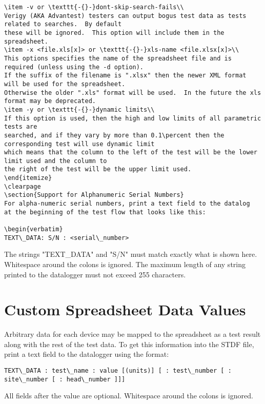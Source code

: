 \documentclass[letterpaper]{article}
\begin{document}
\begin{verbatim}
\item -v or \texttt{-{}-}dont-skip-search-fails\\
Verigy (AKA Advantest) testers can output bogus test data as tests related to searches.  By default
these will be ignored.  This option will include them in the spreadsheet.
\item -x <file.xls[x]> or \texttt{-{}-}xls-name <file.xlsx[x]>\\
This options specifies the name of the spreadsheet file and is required (unless using the -d option).
If the suffix of the filename is ".xlsx" then the newer XML format will be used for the spreadsheet.
Otherwise the older ".xls" format will be used.  In the future the xls format may be deprecated.
\item -y or \texttt{-{}-}dynamic limits\\
If this option is used, then the high and low limits of all parametric tests are
searched, and if they vary by more than 0.1\percent then the corresponding test will use dynamic limit
which means that the column to the left of the test will be the lower limit used and the column to
the right of the test will be the upper limit used.
\end{itemize}
\clearpage
\section{Support for Alphanumeric Serial Numbers}
For alpha-numeric serial numbers, print a text field to the datalog
at the beginning of the test flow that looks like this:

\begin{verbatim}
TEXT\_DATA: S/N : <serial\_number>
\end{verbatim}
The strings "TEXT\_DATA" and "S/N" must match exactly what is shown here.  Whitespace
around the colons is ignored.  The maximum length of any string printed to the datalogger
must not exceed 255 characters.

\section{Custom Spreadsheet Data Values}
Arbitrary data for each device may be mapped to the spreadsheet as a test result along
with the rest of the test data.  To get this information into the STDF file, print a 
text field to the datalogger using the format:
\begin{verbatim}
TEXT\_DATA : test\_name : value [(units)] [ : test\_number [ : site\_number [ : head\_number ]]]
\end{verbatim}
All fields after the value are optional.  Whitespace around the colons is ignored.
\end{document}
